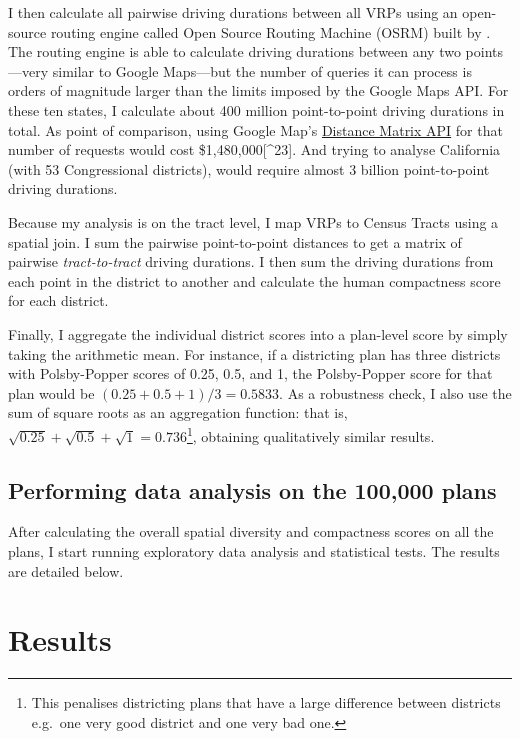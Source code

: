 \documentclass[]{article}
\begin{document}
I then calculate all pairwise driving durations between all VRPs using
an open-source routing engine called Open Source Routing Machine (OSRM)
built by \cite{osrm}. The routing engine is able to calculate driving
durations between any two points---very similar to Google Maps---but the
number of queries it can process is orders of magnitude larger than the
limits imposed by the Google Maps API. For these ten states, I calculate
about 400 million point-to-point driving durations in total. As point of
comparison, using Google Map's
\href{https://developers.google.com/maps/documentation/distance-matrix/usage-and-billing}{Distance
Matrix API} for that number of requests would cost
\$1,480,000{[}\^{}23{]}. And trying to analyse California (with 53
Congressional districts), would require almost 3 billion point-to-point
driving durations.

Because my analysis is on the tract level, I map VRPs to Census Tracts
using a spatial join. I sum the pairwise point-to-point distances to get
a matrix of pairwise \emph{tract-to-tract} driving durations. I then sum
the driving durations from each point in the district to another and
calculate the human compactness score for each district.

Finally, I aggregate the individual district scores into a plan-level
score by simply taking the arithmetic mean. For instance, if a
districting plan has three districts with Polsby-Popper scores of 0.25,
0.5, and 1, the Polsby-Popper score for that plan would be
\((0.25 + 0.5 + 1) / 3 = 0.5833\). As a robustness check, I also use the
sum of square roots as an aggregation function: that is,
\(\sqrt{0.25} + \sqrt{0.5} + \sqrt{1} = 0.736\)\footnote{This penalises
  districting plans that have a large difference between districts
  e.g.~one very good district and one very bad one.}, obtaining
qualitatively similar results.

\hypertarget{performing-data-analysis-on-the-100000-plans}{%
\subsection{Performing data analysis on the 100,000
plans}\label{performing-data-analysis-on-the-100000-plans}}

After calculating the overall spatial diversity and compactness scores
on all the plans, I start running exploratory data analysis and
statistical tests. The results are detailed below.

\hypertarget{results}{%
\section{Results}\label{results}}
\end{document}

